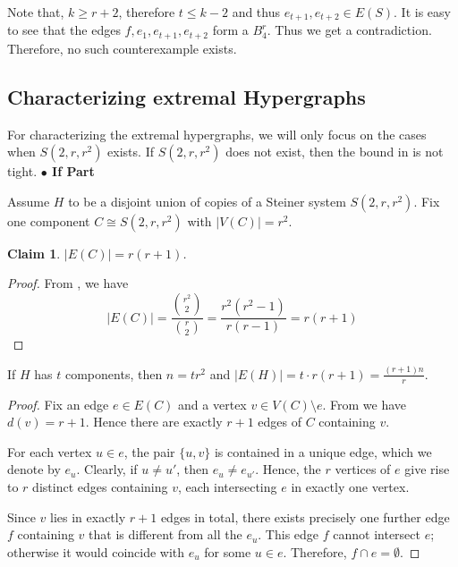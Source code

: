 \documentclass[11pt,a4paper]{article}
\newtheorem{lemma}[theorem]{Lemma}
\newtheorem{claim}[theorem]{Claim}
\theoremstyle{definition}
\theoremstyle{remark}
\begin{document}
        Note that, $k \geq r+2$, therefore $t \leq k-2$ and thus $e_{t+1},e_{t+2} \in E(S)$. It is easy to see that the edges $f,e_1,e_{t+1},e_{t+2}$ form a $B_4^r$. Thus we get a contradiction. Therefore, no such counterexample exists.
    \subsection{Characterizing extremal Hypergraphs}
        For characterizing the extremal hypergraphs, we will only focus on the cases when $S(2,r,r^2)$ exists. If $S(2,r,r^2)$ does not exist, then the bound in  is not tight.
    \newline\textbf{$\bullet$ If Part}
    
\noindent Assume $H$ to be a disjoint union of copies of a Steiner system $S(2,r,r^2)$.
Fix one component $C\cong S(2,r,r^2)$ with $|V(C)|=r^2$.
\begin{claim}
    $|E(C)| = r(r+1)$.
\end{claim}
\begin{proof}
    From , we have $$|E(C)| = \frac{\binom{r^2}{2}}{\binom{r}{2}} = \frac{r^2(r^2-1)}{r(r-1)} = r(r+1)$$
\end{proof}
If $H$ has $t$ components, then $n=t r^2$ and $|E(H)| = t\cdot r(r+1)=\frac{(r+1)n}{r}$.

\begin{proof}
Fix an edge $e\in E(C)$ and a vertex $v\in V(C)\setminus e$. From  we have $d(v) = r+1$. Hence there are exactly $r+1$ edges of $C$ containing $v$.

For each vertex $u\in e$, the pair $\{u,v\}$ is contained in a unique edge, which we denote by $e_u$. Clearly, if $u\neq u'$, then $e_u\neq e_{u'}$. Hence, the $r$ vertices of $e$ give rise to $r$ distinct edges containing $v$, each intersecting $e$ in exactly one vertex.

Since $v$ lies in exactly $r+1$ edges in total, there exists precisely one further edge $f$ containing $v$ that is different from all the $e_u$. This edge $f$ cannot intersect $e$; otherwise it would coincide with $e_u$ for some $u\in e$. Therefore, $f\cap e=\emptyset$.
\end{proof}
\end{document}
